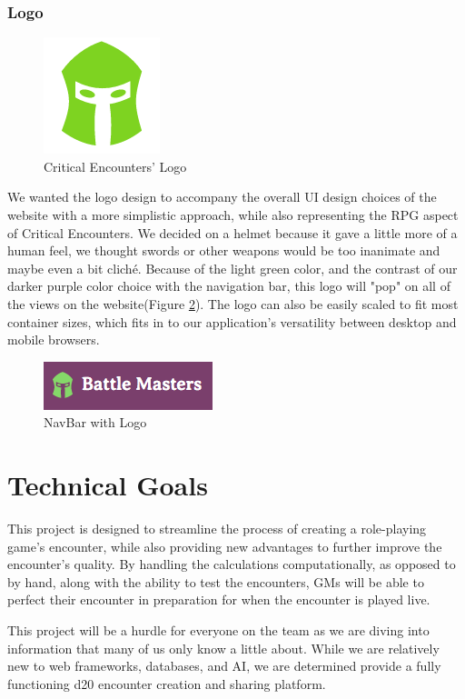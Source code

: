 \documentclass[12pt,a4paper]{report}
\begin{document}
	\subsection {Logo}
	\begin{figure}[H]
		\centering
		\includegraphics[scale=.5]{logo-large}
		\caption{Critical Encounters' Logo}
		\label{fig: Critical Encounters' Logo}
	\end{figure}
	We wanted the logo design to accompany the overall UI design choices of the website with a more simplistic approach, while also representing the RPG aspect of Critical Encounters. We decided on a helmet because it gave a little more of a human feel, we thought swords or other weapons would be too inanimate and maybe even a bit cliché. Because of the light green color, and the contrast of our darker purple color choice with the navigation bar, this logo will "pop" on all of the views on the website(Figure \ref{fig: NavBar with Logo}). The logo can also be easily scaled to fit most container sizes, which fits in to our application's versatility between desktop and mobile browsers.
	\bigskip
	\begin{figure}[H]
		\centering
		\centerline{\includegraphics[scale=1]{navbar-logo}}
		\caption{NavBar with Logo}
		\label{fig: NavBar with Logo}
	\end{figure}
\newpage
\chapter*{Technical Goals}
This project is designed to streamline the process of creating a role-playing game's encounter, while also providing new advantages to further improve the encounter's quality. By handling the calculations computationally, as opposed to by hand, along with the ability to test the encounters, GMs will be able to perfect their encounter in preparation for when the encounter is played live.

This project will be a hurdle for everyone on the team as we are diving into information that many of us only know a little about. While we are relatively new to web frameworks, databases, and AI, we are determined provide a fully functioning d20 encounter creation and sharing platform.
\end{document}

